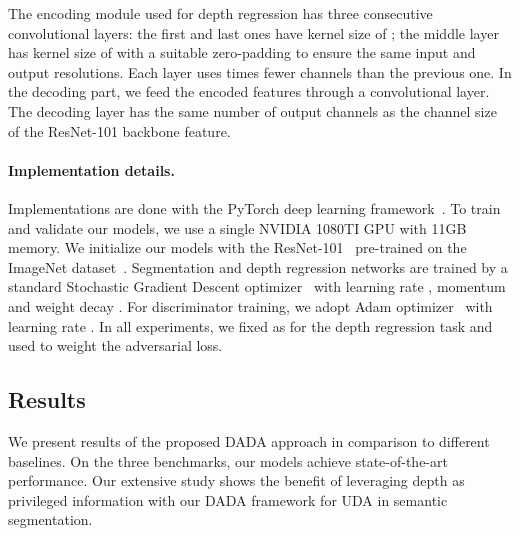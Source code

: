 \documentclass[10pt,twocolumn,letterpaper]{article}
\begin{document}
The encoding module used for depth regression has three consecutive convolutional layers: the first and last ones have kernel size of ; the middle layer has kernel size of  with a suitable zero-padding to ensure the same input and output resolutions. Each layer uses  times fewer channels than the previous one.
In the decoding part, we feed the encoded features through a  convolutional layer.
The decoding layer has the same number of output channels as the channel size of the ResNet-101 backbone feature.

\vspace{-0.3cm}
\paragraph{Implementation details.}
Implementations are done with the PyTorch deep learning framework~\cite{paszke2017automatic}.
To train and validate our models, we use a single NVIDIA 1080TI GPU with 11GB memory.
We initialize our models with the ResNet-101~\cite{He2015} pre-trained on the ImageNet dataset~\cite{deng2009imagenet}.
Segmentation and depth regression networks are trained by a standard Stochastic Gradient Descent optimizer~\cite{bottou2010large} with learning rate , momentum  and weight decay . 
For discriminator training, we adopt Adam optimizer~\cite{kingma2014adam} with learning rate .
In all experiments, we fixed  as  for the depth regression task and used  to weight the adversarial loss.
\subsection{Results} \label{sec:exp_res}

We present results of the proposed DADA approach in comparison to different baselines.
On the three benchmarks, our models achieve state-of-the-art performance.
Our extensive study shows the benefit of leveraging depth as privileged information with our DADA framework for UDA in semantic segmentation.

\vspace{-0.3cm}
\end{document}
